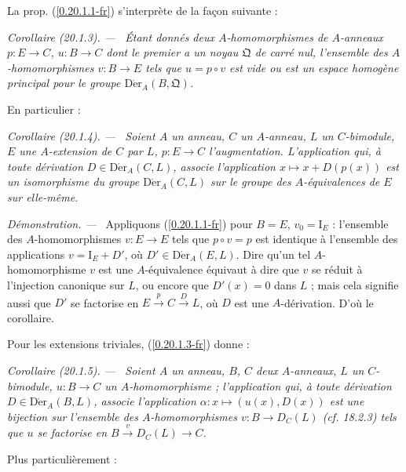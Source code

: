 \documentclass[10pt,oneside]{book}
\makeatletter
\newcommand{\sref}[1]{(\ref{#1})}
\newcommand{\setmanualcurrentlabel}[1]{\def\@currentlabel{#1}}
\newcommand{\oldpage}[2][]{%
  \setcounter{footnote}{0}%
  \marginpar{\scriptsize\textbf{#1}~|~#2}\ignorespaces}
\newenvironment{corollary}[1][]{%
  \setmanualcurrentlabel{#1}\par\medskip\noindent\itshape Corollaire (#1). ---\ }{\par}
\newenvironment{proof}{%
  \par\medskip\noindent\textit{Démonstration. ---\ }}{\par}
\makeatother
\begin{document}
\oldpage[0\textsubscript{IV-1}]{118}
La prop. \sref{0.20.1.1-fr} s'interprète de la façon suivante :

\begin{corollary}[20.1.3]
\label{0.20.1.3-fr}
Étant donnés deux $A$-homomorphismes de $A$-anneaux $p:E\to C$,
$u:B\to C$ dont le premier a un noyau $\mathfrak{Q}$ de carré nul,
l'ensemble des $A$-homomorphismes $v:B\to E$ tels que $u=p\circ v$ est vide
ou est un espace homogène principal pour le groupe
$\operatorname{D\acute{e}r}_A(B,\mathfrak{Q})$.
\end{corollary}

En particulier :

\begin{corollary}[20.1.4]
\label{0.20.1.4-fr}
Soient $A$ un anneau, $C$ un $A$-anneau, $L$ un $C$-bimodule, $E$ une
$A$-extension de $C$ par $L$, $p:E\to C$ l'augmentation. L'application qui,
à toute dérivation $D\in\operatorname{D\acute{e}r}_A(C,L)$, associe l'application
$x\mapsto x+D(p(x))$ est un isomorphisme du groupe
$\operatorname{D\acute{e}r}_A(C,L)$ sur le groupe des $A$-équivalences de $E$ sur
elle-même.
\end{corollary}

\begin{proof}
Appliquons \sref{0.20.1.1-fr} pour $B=E$, $v_0=\mathrm{I}_E$ : l'ensemble
des $A$-homomorphismes $v:E\to E$ tels que $p\circ v=p$ est identique à
l'ensemble des applications $v=\mathrm{I}_E+D'$, où
$D'\in\operatorname{D\acute{e}r}_A(E,L)$. Dire qu'un tel $A$-homomorphisme $v$ est
une $A$-équivalence équivaut à dire que $v$ se réduit à l'injection canonique
sur $L$, ou encore que $D'(x)=0$ dans $L$ ; mais cela signifie aussi que
$D'$ se factorise en $E\xrightarrow{p}C\xrightarrow{D}L$, où $D$ est une
$A$-dérivation. D'où le corollaire.
\end{proof}

Pour les extensions triviales, \sref{0.20.1.3-fr} donne :

\begin{corollary}[20.1.5]
\label{0.20.1.5-fr}
Soient $A$ un anneau, $B$, $C$ deux $A$-anneaux, $L$ un $C$-bimodule,
$u:B\to C$ un $A$-homomorphisme ; l'application qui, à toute dérivation
$D\in\operatorname{D\acute{e}r}_A(B,L)$, associe l'application
$\alpha:x\mapsto(u(x),D(x))$ est une bijection sur l'ensemble des
$A$-homomorphismes $v:B\to D_C(L)$ (cf. 18.2.3) tels que $u$ se factorise en
$B\xrightarrow{v}D_C(L)\to C$.
\end{corollary}

Plus particulièrement :
\end{document}
